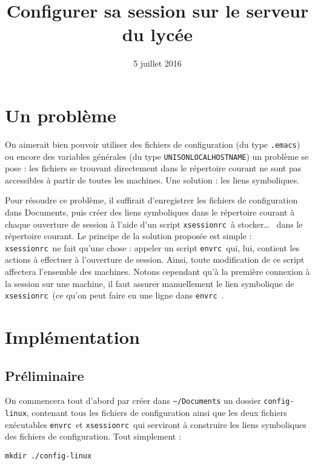 \documentclass[11pt,a4paper]{article}
\title{Configurer sa session sur le serveur du lycée}
\date{5 juillet 2016}
\author{}
\newcommand{\ttt}[1]{\texttt{#1}}
\newcommand{\envrc}[0]{\ttt{envrc}~}
\newcommand{\xsessionrc}[0]{\ttt{xsessionrc}~}
\newcommand{\tld}[0]{\textasciitilde}
\begin{document}

\maketitle

\section{Un problème}

On aimerait bien pouvoir utiliser des fichiers de configuration (du type \ttt{.emacs}) ou encore des variables générales (du type \ttt{UNISONLOCALHOSTNAME}) un problème se pose : les fichiers se trouvant directement dans le répertoire courant ne sont pas accessibles à partir de toutes les machines. Une solution : les liens symboliques. \par
Pour résoudre ce problème, il suffirait d'enregistrer les fichiers de configuration dans Documents, puis créer des liens symboliques dans le répertoire courant à chaque ouverture de session à l'aide d'un script \xsessionrc à stocker\dots ~ dans le répertoire courant. 
Le principe de la solution proposée est simple : \xsessionrc ne fait qu'une chose : appeler un script \envrc  qui, lui, contient les actions à effectuer à l'ouverture de session. Ainsi, toute modification de ce script affectera l'ensemble des machines.
Notons cependant qu'à la première connexion à la session sur une machine, il faut assurer manuellement le lien symbolique de \xsessionrc (ce qu'on peut faire en une ligne dans \envrc .


\section{Implémentation}

	\subsection{Préliminaire}

On commencera tout d'abord par créer dans \ttt{\tld/Documents} un dossier \ttt{config-linux}, contenant tous les fichiers de configuration ainsi que les deux fichiers exécutables \envrc  et \xsessionrc  qui serviront à construire les liens symboliques des fichiers de configuration. Tout simplement :
\begin{lstlisting}
mkdir ./config-linux
\end{lstlisting}
\end{document}
